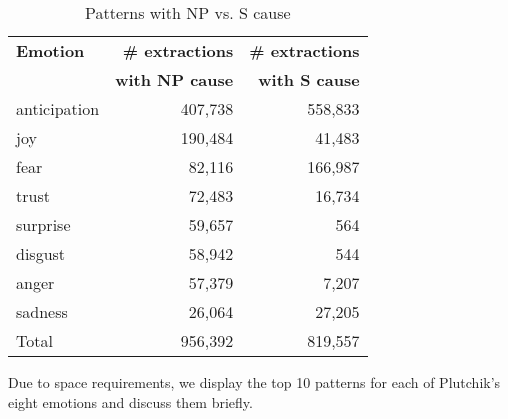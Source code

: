 \begin{table}[h]
\centering
\begin{tabular}{l|r|r}
{\bf Emotion} & {\bf \# extractions} & {\bf \# extractions} \\
{\bf }        & {\bf with NP cause}         & {\bf with S cause}          \\\hline
anticipation  & 407,738 & 558,833                \\
joy           & 190,484 & 41,483                 \\
fear          & 82,116 & 166,987                \\
trust         & 72,483 & 16,734                 \\
surprise      & 59,657 & 564                    \\
disgust       & 58,942 & 544                    \\
anger         & 57,379 & 7,207                  \\
sadness       & 26,064 & 27,205                 \\\hline
Total         & 956,392 &	819,557
\end{tabular}
\caption{Patterns with NP vs. S cause}
\label{tab:patterns-np-vs-s}
\end{table}

Due to space requirements, we display the top 10 patterns for each of Plutchik's eight emotions and discuss them briefly.

